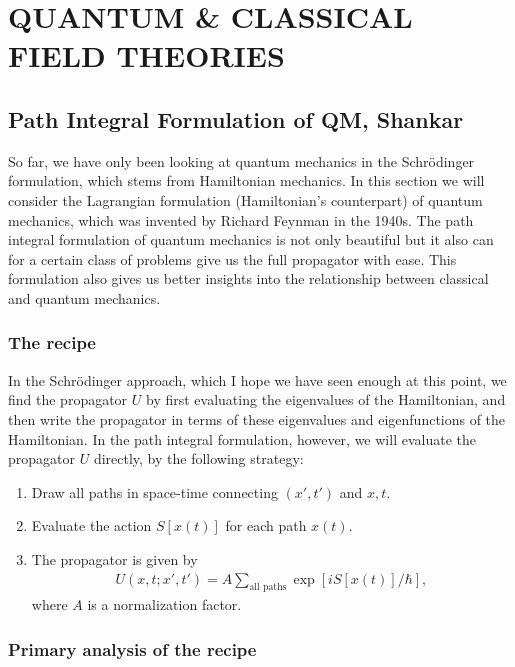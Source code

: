\documentclass{book}
\theoremstyle{definition}
\newcommand{\lb}{\left[}
\newcommand{\rb}{\right]}
\begin{document}
\chapter{QUANTUM \& CLASSICAL FIELD THEORIES}


\newpage



\section{Path Integral Formulation of QM, Shankar}




So far, we have only been looking at quantum mechanics in the Schr\"{o}dinger formulation, which stems from Hamiltonian mechanics. In this section we will consider the Lagrangian formulation (Hamiltonian's counterpart) of quantum mechanics, which was invented by Richard Feynman in the 1940s. The path integral formulation of quantum mechanics is not only beautiful but it also can for a certain class of problems give us the full propagator with ease. This formulation also gives us better insights into the relationship between classical and quantum mechanics. \\


\subsection{The recipe}


In the Schr\"{o}dinger approach, which I hope we have seen enough at this point, we find the propagator $U$ by first evaluating the eigenvalues of the Hamiltonian, and then write the propagator in terms of these eigenvalues and eigenfunctions of the Hamiltonian. In the path integral formulation, however, we will evaluate the propagator $U$ directly, by the following strategy:
\begin{enumerate}
	\item Draw all paths in space-time connecting $(x',t')$ and $x,t$.
	\item Evaluate the action $S[x(t)]$ for each path $x(t)$.
	\item The propagator is given by
	\begin{align}
	U(x,t;x',t') = A \sum_{\text{all paths}} \exp\lb iS[x(t)]/\hbar \rb,
	\end{align}
	where $A$ is a normalization factor. 
\end{enumerate}



\subsection{Primary analysis of the recipe}
\end{document}
